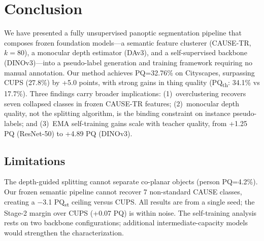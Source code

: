 \documentclass{bmvc2k}
\newcommand{\pqt}{PQ\textsubscript{th}\xspace}
\newcommand{\pqs}{PQ\textsubscript{st}\xspace}
\begin{document}
\section{Conclusion}

We have presented a fully unsupervised panoptic segmentation pipeline that composes frozen foundation models---a semantic feature clusterer (CAUSE-TR, $k{=}80$), a monocular depth estimator (DAv3), and a self-supervised backbone (DINOv3)---into a pseudo-label generation and training framework requiring no manual annotation. Our method achieves PQ=32.76\% on Cityscapes, surpassing CUPS (27.8\%) by +5.0 points, with strong gains in thing quality (\pqt: 34.1\% vs 17.7\%). Three findings carry broader implications: (1)~overclustering recovers seven collapsed classes in frozen CAUSE-TR features; (2)~monocular depth quality, not the splitting algorithm, is the binding constraint on instance pseudo-labels; and (3)~EMA self-training gains scale with teacher quality, from +1.25 PQ (ResNet-50) to +4.89 PQ (DINOv3).

\subsection*{Limitations}
The depth-guided splitting cannot separate co-planar objects (person PQ=4.2\%). Our frozen semantic pipeline cannot recover 7 non-standard CAUSE classes, creating a $-$3.1 \pqs ceiling versus CUPS. All results are from a single seed; the Stage-2 margin over CUPS (+0.07 PQ) is within noise. The self-training analysis rests on two backbone configurations; additional intermediate-capacity models would strengthen the characterization.

\FloatBarrier

\end{document}
